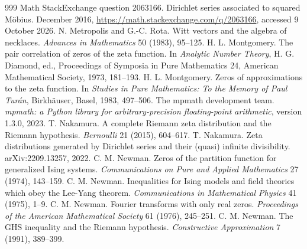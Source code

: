 \begin{thebibliography}{999}
 Math StackExchange question 2063166. Dirichlet series associated to squared M\"obius. December 2016, \url{https://math.stackexchange.com/q/2063166}, accessed 9 October 2026.
 N. Metropolis and G.-C. Rota. Witt vectors and the algebra of necklaces. \emph{Advances in Mathematics} 50 (1983), 95--125.
 H. L. Montgomery. The pair correlation of zeros of the zeta function. In \emph{Analytic Number Theory}, H. G. Diamond, ed., Proceedings of Symposia in Pure Mathematics 24, American Mathematical Society, 1973, 181--193.
 H. L. Montgomery. Zeros of approximations to the zeta function. In \emph{Studies in Pure Mathematics: To the Memory of Paul Tur\'an}, Birkh\"auser, Basel, 1983, 497--506.
 The mpmath development team. \emph{mpmath: a Python library for arbitrary-precision floating-point arithmetic}, version 1.3.0, 2023.
 T. Nakamura. A complete Riemann zeta distribution and the Riemann hypothesis. \emph{Bernoulli} 21 (2015), 604--617.
 T. Nakamura. Zeta distributions generated by Dirichlet series and their (quasi) infinite divisibility. arXiv:2209.13257, 2022.
 C. M. Newman. Zeros of the partition function for generalized Ising systems. \emph{Communications on Pure and Applied Mathematics} 27 (1974), 143--159.
 C. M. Newman. Inequalities for Ising models and field theories which obey the Lee-Yang theorem. \emph{Communications in Mathematical Physics} 41 (1975), 1--9.
 C. M. Newman. Fourier transforms with only real zeros. \emph{Proceedings of the American Mathematical Society} 61 (1976), 245--251.
 C. M. Newman. The GHS inequality and the Riemann hypothesis. \emph{Constructive Approximation} 7 (1991), 389--399.

\end{thebibliography}
